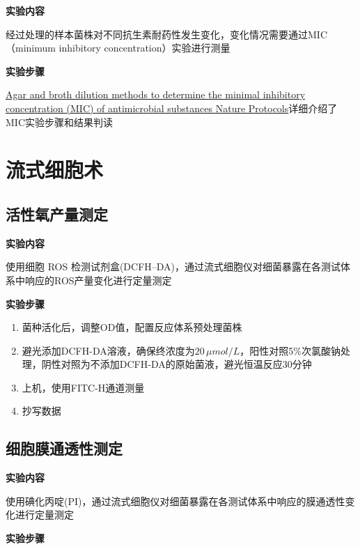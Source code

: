 \documentclass[
]{book}
\providecommand{\tightlist}{%
  \setlength{\itemsep}{0pt}\setlength{\parskip}{0pt}}
\begin{document}
\textbf{实验内容}

经过处理的样本菌株对不同抗生素耐药性发生变化，变化情况需要通过MIC（minimum inhibitory concentration）实验进行测量

\textbf{实验步骤}

\href{https://www.nature.com/articles/nprot.2007.521}{Agar and broth dilution methods to determine the minimal inhibitory concentration (MIC) of antimicrobial substances \textbar{} Nature Protocols}详细介绍了MIC实验步骤和结果判读

\hypertarget{ux6d41ux5f0fux7ec6ux80deux672f}{%
\section{流式细胞术}\label{ux6d41ux5f0fux7ec6ux80deux672f}}

\hypertarget{ux6d3bux6027ux6c27ux4ea7ux91cfux6d4bux5b9a}{%
\subsection{活性氧产量测定}\label{ux6d3bux6027ux6c27ux4ea7ux91cfux6d4bux5b9a}}

\textbf{实验内容}

使用细胞 ROS 检测试剂盒(DCFH--DA)，通过流式细胞仪对细菌暴露在各测试体系中响应的ROS产量变化进行定量测定

\textbf{实验步骤}

\begin{enumerate}
\def\labelenumi{\arabic{enumi}.}
\tightlist
\item
  菌种活化后，调整OD值，配置反应体系预处理菌株
\item
  避光添加DCFH-DA溶液，确保终浓度为\(20\,\mu mol/L\)，阳性对照5\%次氯酸钠处理，阴性对照为不添加DCFH‐DA的原始菌液，避光恒温反应30分钟
\item
  上机，使用FITC-H通道测量
\item
  抄写数据
\end{enumerate}

\hypertarget{ux7ec6ux80deux819cux901aux900fux6027ux6d4bux5b9a}{%
\subsection{细胞膜通透性测定}\label{ux7ec6ux80deux819cux901aux900fux6027ux6d4bux5b9a}}

\textbf{实验内容}

使用碘化丙啶(PI)，通过流式细胞仪对细菌暴露在各测试体系中响应的膜通透性变化进行定量测定

\textbf{实验步骤}
\end{document}
